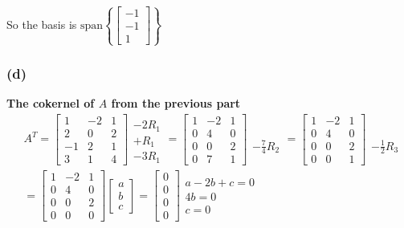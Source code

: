 \documentclass[10pt,letterpaper]{article}
\begin{document}
		So the basis is $\boxed{\text{span} \left\lbrace \begin{bmatrix}
			-1 \\ -1 \\ 1
			\end{bmatrix} \right\rbrace }$
	\subsubsection*{(d)} \textbf{The cokernel of $A$ from the previous part}
	\begin{align*}
	& A^T = \begin{bmatrix}
	1 & -2 & 1\\ 2 & 0 & 2\\ -1 & 2 & 1\\ 3 & 1 & 4 
	\end{bmatrix} \begin{array}{c}
	 \\ -2 R_1 \\ +R_1 \\ -3R_1
	\end{array} = \begin{bmatrix}
	1 & -2 & 1\\ 0 & 4 & 0\\ 0 & 0 & 2\\ 0 & 7 & 1 
	\end{bmatrix} \begin{array}{c}
	\\ \\ \\ -\frac{7}{4} R_2
	\end{array} = \begin{bmatrix}
	1 & -2 & 1\\ 0 & 4 & 0\\ 0 & 0 & 2\\ 0 & 0 & 1 
	\end{bmatrix}  \begin{array}{c}
	\\ \\ \\ -\frac{1}{2}R_3
	\end{array} \\ 
	& = \begin{bmatrix}
	1 & -2 & 1\\ 0 & 4 & 0\\ 0 & 0 & 2\\ 0 & 0 & 0 
	\end{bmatrix} \begin{bmatrix}
	a \\ b \\ c
	\end{bmatrix} = \begin{bmatrix}
	0 \\ 0 \\ 0 \\ 0
	\end{bmatrix} \begin{array}{c}
	a -2b + c = 0 \\ 4b = 0 \\ c = 0
	\end{array}
	\end{align*} 
\end{document}
